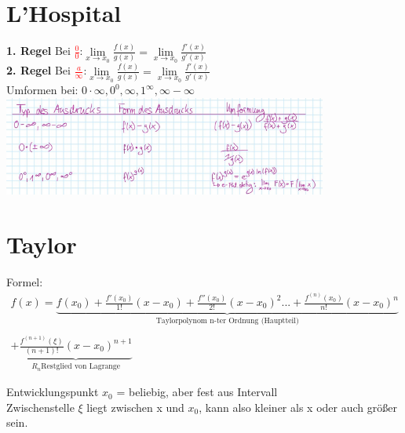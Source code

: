 \documentclass[12pt,a4paper]{article}
\begin{document}
\section{L'Hospital}
\textbf{1. Regel} Bei \textcolor{red}{$\frac{0}{0}$}:$\lim\limits_{x\rightarrow x_0}\frac{f(x)}{g(x)}=\lim\limits_{x\rightarrow x_0}\frac{f'(x)}{g'(x)}$\\
\textbf{2. Regel} Bei \textcolor{red}{$\frac{a}{\infty}$}:$\lim\limits_{x\rightarrow x_0}\frac{f(x)}{g(x)}=\lim\limits_{x\rightarrow x_0}\frac{f'(x)}{g'(x)}$\\
Umformen bei: $0\cdot\infty, 0^0,\infty,1^\infty,\infty-\infty$\\
\includegraphics[width=0.8\textwidth]{Bilder/Zusfa/1.png}
\section{Taylor}
Formel:
$$
\begin{matrix}
f(x)=\underbrace{f(x_0)+\frac{f'(x_0)}{1!}\left(x-x_0\right)+\frac{f''(x_0)}{2!}\left(x-x_0\right)^2...+\frac{f^{(n)}(x_0)}{n!}\left(x-x_0\right)^n}_{\text{Taylorpolynom n-ter Ordnung (Hauptteil)}}\\
\\
+\underbrace{\frac{f^{(n+1)}(\xi)}{\left(n+1\right)!}\left(x-x_0\right)^{n+1}}_{R_n \text{Restglied von Lagrange}}
\end{matrix}
$$

Entwicklungspunkt $x_0$ = beliebig, aber fest aus Intervall\\
Zwischenstelle $\xi$ liegt zwischen x und $x_0$, kann also kleiner als x oder auch größer sein.\\
\end{document}
